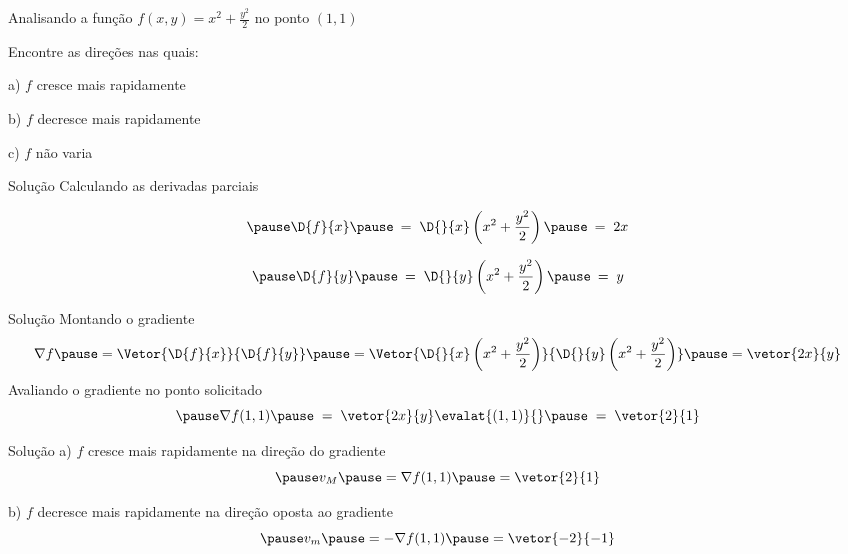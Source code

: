 \begin{question}
  Analisando a função \(f(x, y) = x^2 + \frac{y^2}{2}\)
  no ponto \((1, 1)\)

  Encontre as direções nas quais:

  a)\; $f$ cresce mais rapidamente

  b)\; $f$ decresce mais rapidamente

  c)\; $f$ não varia
\end{question}

\begin{resolution}{Solução}
  Calculando as derivadas parciais

  \[
    \pause
    \D{f}{x}
    \pause
    \:=\; \D{}{x}\left(x^2 + \frac{y^2}{2}\right)
    \pause
    \:=\; 2x
  \]

  \[
    \pause
    \D{f}{y}
    \pause
    \:=\; \D{}{y}\left(x^2 + \frac{y^2}{2}\right)
    \pause
    \:=\; y
  \]
\end{resolution}

\begin{resolution}{Solução}
  Montando o gradiente
  \pause
  \[
    \nabla f
    \pause
    = \Vetor{\D{f}{x}}{\D{f}{y}}
    \pause
    = \Vetor{\D{}{x}\left(x^2 + \frac{y^2}{2}\right)}
            {\D{}{y}\left(x^2 + \frac{y^2}{2}\right)}
    \pause
    = \vetor{2x}{y}
  \]
  \pause
  Avaliando o gradiente no ponto solicitado
  \[
    \pause
    \nabla f(1, 1)
    \pause
    \;=\; \vetor{2x}{y}\evalat{(1, 1)}{}
    \pause
    \;=\; \vetor{2}{1}
  \]
\end{resolution}

\begin{resolution}{Solução}
  a)\; $f$ cresce mais rapidamente
  \pause
  na direção do gradiente
  \[
    \pause
    v_M
    \pause
    = \nabla f(1, 1)
    \pause
    = \vetor{2}{1}
  \]

  \pause
  b)\; $f$ decresce mais rapidamente
  \pause
  na direção oposta ao gradiente
  \[
    \pause
    v_m
    \pause
    = -\nabla f (1, 1)
    \pause
    = \vetor{-2}{-1}
  \]
\end{resolution}

